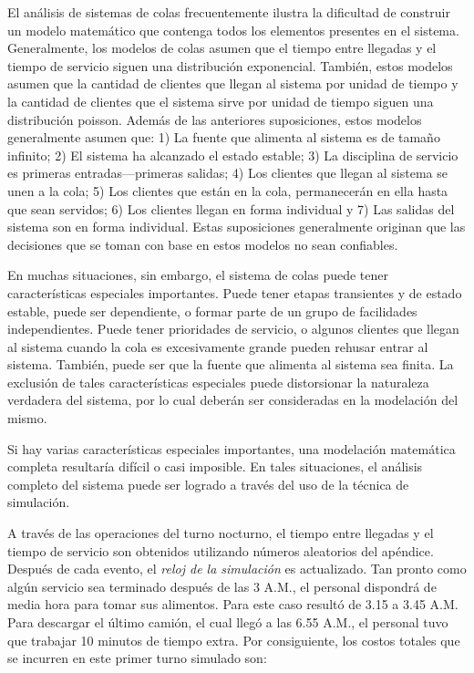\documentclass[11pt,letterpaper]{report}
\begin{document}
El análisis de sistemas de colas frecuentemente ilustra la dificultad de
construir un modelo matemático que contenga todos los elementos presentes en
el sistema. Generalmente, los modelos de colas asumen que el tiempo entre
llegadas y el tiempo de servicio siguen una distribución exponencial.
También, estos modelos asumen que la cantidad de clientes que llegan al
sistema por unidad de tiempo y la cantidad de clientes que el sistema sirve
por unidad de tiempo siguen una distribución poisson. Además de las
anteriores suposiciones, estos modelos generalmente asumen que: 1) La fuente
que alimenta al sistema es de tamaño infinito; 2) El sistema ha alcanzado el
estado estable; 3) La disciplina de servicio es primeras
entradas---primeras salidas; 4) Los clientes que llegan al sistema se unen a
la cola; 5) Los clientes que están en la cola, permanecerán en ella hasta
que sean servidos; 6) Los clientes llegan en forma individual y 7) Las
salidas del sistema son en forma individual. Estas suposiciones generalmente
originan que las decisiones que se toman con base en estos modelos no sean
confiables.

En muchas situaciones, sin embargo, el sistema de colas puede tener
características especiales importantes. Puede tener etapas transientes y de
estado estable, puede ser dependiente, o formar parte de un grupo de
facilidades independientes. Puede tener prioridades de servicio, o algunos
clientes que llegan al sistema cuando la cola es excesivamente grande pueden
rehusar entrar al sistema. También, puede ser que la fuente que alimenta al
sistema sea finita. La exclusión de tales características especiales puede
distorsionar la naturaleza verdadera del sistema, por lo cual deberán ser
consideradas en la modelación del mismo.

Si hay varias características especiales importantes, una modelación
matemática completa resultaría difícil o casi imposible. En tales
situaciones, el análisis completo del sistema puede ser logrado a través del
uso de la técnica de simulación.

A través de las operaciones del turno nocturno, el tiempo entre llegadas y
el tiempo de servicio son obtenidos utilizando números aleatorios del
apéndice. Después de cada evento, el \emph{reloj de la simulación} es
actualizado. Tan pronto como algún servicio sea terminado después de las 3
A.M., el personal dispondrá de media hora para tomar sus alimentos. Para
este caso resultó de 3.15 a 3.45 A.M. Para descargar el último camión, el
cual llegó a las 6.55 A.M., el personal tuvo que trabajar 10 minutos de
tiempo extra. Por consiguiente, los costos totales que se incurren en este
primer turno simulado son:
\end{document}
